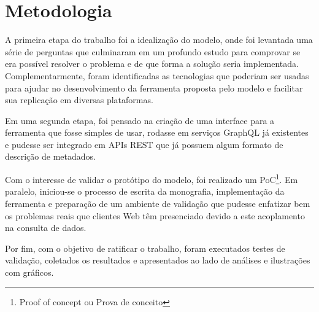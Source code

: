\section[Metodologia]{Metodologia}

A primeira etapa do trabalho foi a idealização do modelo, onde foi levantada uma série de perguntas que culminaram em um profundo estudo para comprovar se era possível resolver o problema e de que forma a solução seria implementada. Complementarmente, foram identificadas as tecnologias que poderiam ser usadas para ajudar no desenvolvimento da ferramenta proposta pelo modelo e facilitar sua replicação em diversas plataformas.

Em uma segunda etapa, foi pensado na criação de uma interface para a ferramenta que fosse simples de usar, rodasse em serviços GraphQL já existentes e pudesse ser integrado em APIs REST que já possuem algum formato de descrição de metadados.

Com o interesse de validar o protótipo do modelo, foi realizado um PoC\footnote{
  Proof of concept ou Prova de conceito
}. Em paralelo, iniciou-se o processo de escrita da monografia, implementação da ferramenta e preparação de um ambiente de validação que pudesse enfatizar bem os problemas reais que clientes Web têm presenciado devido a este acoplamento na consulta de dados.

Por fim, com o objetivo de ratificar o trabalho, foram executados testes de validação, coletados os resultados e apresentados ao lado de análises e ilustrações com gráficos.
